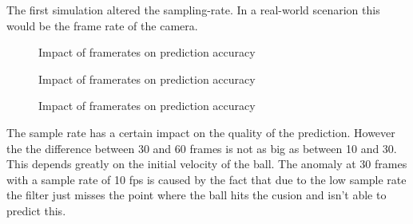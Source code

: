 \documentclass[notitlepage, a4paper, 11pt]{scrartcl}
\begin{document}
\begin{multicols}{2}
The first simulation altered the sampling-rate. In a real-world scenarion this would be the frame rate of the camera.

\begin{figure}[H]
    \centering
    \caption{Impact of framerates on prediction accuracy}
    \label{fig:framerate10}
\end{figure}

\begin{figure}[H]
    \centering
    \caption{Impact of framerates on prediction accuracy}
    \label{fig:framerate30}
\end{figure}

\begin{figure}[H]
    \centering
    \caption{Impact of framerates on prediction accuracy}
    \label{fig:framerate60}
\end{figure}

The sample rate has a certain impact on the quality of the prediction. However the the difference between 30 and 60 frames is not as big as between 10 and 30. 
This depends greatly on the initial velocity of the ball. The anomaly at 30 frames with a sample rate of 10 fps is caused by the fact that due to the low sample rate 
the filter just misses the point where the ball hits the cusion and isn't able to predict this.


\end{multicols}
\end{document}
